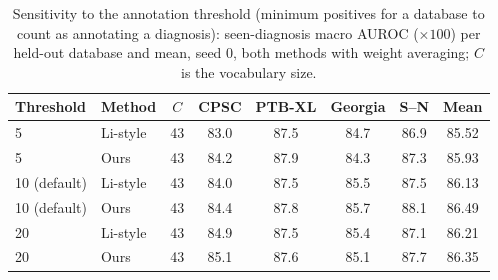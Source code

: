 \begin{table}[!htbp]
\centering\footnotesize
\setlength{\tabcolsep}{4pt}
\caption{Sensitivity to the annotation threshold (minimum positives for a database to count as annotating a diagnosis): seen-diagnosis macro AUROC ($\times100$) per held-out database and mean, seed 0, both methods with weight averaging; $C$ is the vocabulary size.}\label{tab:threshold}
\begin{tabular}{llcccccc}
\toprule
Threshold & Method & $C$ & CPSC & PTB-XL & Georgia & S--N & Mean \\
\midrule
5 & Li-style & 43 & 83.0 & 87.5 & 84.7 & 86.9 & 85.52 \\
5 & Ours & 43 & 84.2 & 87.9 & 84.3 & 87.3 & 85.93 \\
\midrule
10 (default) & Li-style & 43 & 84.0 & 87.5 & 85.5 & 87.5 & 86.13 \\
10 (default) & Ours & 43 & 84.4 & 87.8 & 85.7 & 88.1 & 86.49 \\
\midrule
20 & Li-style & 43 & 84.9 & 87.5 & 85.4 & 87.1 & 86.21 \\
20 & Ours & 43 & 85.1 & 87.6 & 85.1 & 87.7 & 86.35 \\
\bottomrule
\end{tabular}
\end{table}
